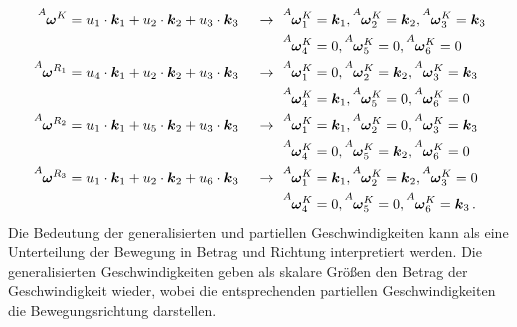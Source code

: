 \begin{align}
\vel{A}{\omega}{K} &= u\idx1 \cdot \bs{k}\idx1 + u\idx2 \cdot \bs{k}\idx2 + u\idx3 \cdot \bs{k}\idx3 &\rArrow &\vel{A}{\omega}{K}\idx1 = \bs{k}\idx1, \vel{A}{\omega}{K}\idx2 = \bs{k}\idx2, \vel{A}{\omega}{K}\idx3 = \bs{k}\idx3 \\
& & &\vel{A}{\omega}{K}\idx4 = 0, \vel{A}{\omega}{K}\idx5 = 0, \vel{A}{\omega}{K}\idx6 = 0 \nonumber
\\
\vel{A}{\omega}{R\idx1} &= u\idx4 \cdot \bs{k}\idx1 + u\idx2 \cdot \bs{k}\idx2 + u\idx3 \cdot \bs{k}\idx3 &\rArrow 
&\vel{A}{\omega}{K}\idx1 = 0, \vel{A}{\omega}{K}\idx2 = \bs{k}\idx2, \vel{A}{\omega}{K}\idx3 = \bs{k}\idx3 \\
& & &\vel{A}{\omega}{K}\idx4 = \bs{k}\idx1, \vel{A}{\omega}{K}\idx5 = 0, \vel{A}{\omega}{K}\idx6 = 0 \nonumber
\\
\vel{A}{\omega}{R\idx2} &= u\idx1 \cdot \bs{k}\idx1 + u\idx5 \cdot \bs{k}\idx2 + u\idx3 \cdot \bs{k}\idx3&\rArrow 
&\vel{A}{\omega}{K}\idx1 = \bs{k}\idx1, \vel{A}{\omega}{K}\idx2 = 0, \vel{A}{\omega}{K}\idx3 = \bs{k}\idx3 \\
& & &\vel{A}{\omega}{K}\idx4 = 0, \vel{A}{\omega}{K}\idx5 = \bs{k}\idx2, \vel{A}{\omega}{K}\idx6 = 0 \nonumber
\\
\vel{A}{\omega}{R\idx3} &= u\idx1 \cdot \bs{k}\idx1 + u\idx2 \cdot \bs{k}\idx2 + u\idx6 \cdot \bs{k}\idx3&\rArrow 
&\vel{A}{\omega}{K}\idx1 = \bs{k}\idx1, \vel{A}{\omega}{K}\idx2 = \bs{k}\idx2, \vel{A}{\omega}{K}\idx3 = 0 \\
& & &\vel{A}{\omega}{K}\idx4 = 0, \vel{A}{\omega}{K}\idx5 = 0, \vel{A}{\omega}{K}\idx6 = \bs{k}\idx3 \nonumber \,.
\end{align}
Die Bedeutung der generalisierten und partiellen Geschwindigkeiten kann als eine Unterteilung der Bewegung in Betrag und Richtung interpretiert werden. Die generalisierten Geschwindigkeiten geben als skalare Größen den Betrag der Geschwindigkeit wieder, wobei die entsprechenden partiellen Geschwindigkeiten die Bewegungsrichtung darstellen.
